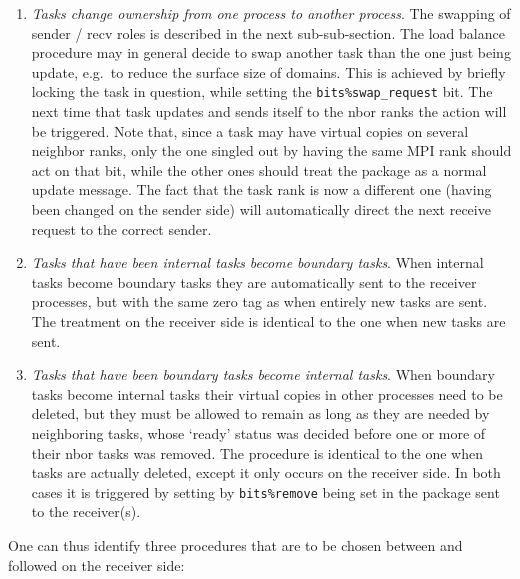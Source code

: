 \documentclass[paper=a4,fontsize=11pt]{scrartcl}
\numberwithin{equation}{section}		%
\numberwithin{figure}{section}			%
\numberwithin{table}{section}				%
\newcommand{\codecolor}{\color{Blue}}
\newcommand{\Code}[1]{{\codecolor\texttt{#1}}}
\begin{document}
\begin{enumerate}
    \item \textit{Tasks change ownership from one process to another process}.  The swapping of sender / recv roles is described in the next sub-sub-section.  The load balance procedure may in general decide to swap another task than the one just being update, e.g.\ to reduce the surface size of domains.  This is achieved by briefly locking the task in question, while setting the \Code{bits\%swap\_request} bit. The next time that task updates and sends itself to the nbor ranks the action will be triggered.  Note that, since a task may have virtual copies on several neighbor ranks, only the one singled out by having the same MPI rank should act on that bit, while the other ones should treat the package as a normal update message.  The fact that the task rank is now a different one (having been changed on the sender side) will automatically direct the next receive request to the correct sender. 
    
    \item \textit{Tasks that have been internal tasks become boundary tasks}.  When internal tasks become boundary tasks they are automatically sent to the receiver processes, but with the same zero tag as when entirely new tasks are sent.   The treatment on the receiver side is identical to the one when new tasks are sent.
    
    \item \textit{Tasks that have been boundary tasks become internal tasks}.   When boundary tasks become internal tasks their virtual copies in other processes need to be deleted, but they must be allowed to remain as long as they are needed by neighboring tasks, whose `ready' status was decided before one or more of their nbor tasks was removed.   The procedure is identical to the one when tasks are actually deleted, except it only occurs on the receiver side.  In both cases it is triggered by setting by \Code{bits\%remove} being set in the package sent to the receiver(s).
\end{enumerate}
One can thus identify three procedures that are to be chosen between and followed on the receiver side:
\end{document}
